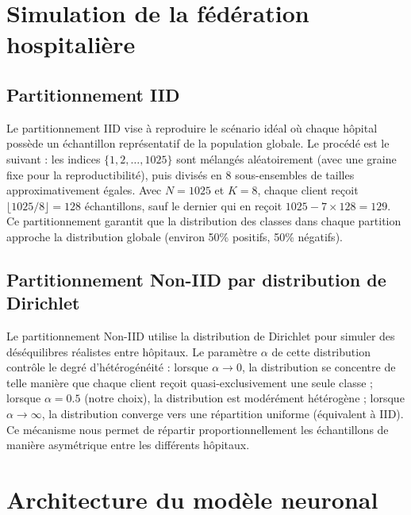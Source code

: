 \documentclass[12pt,a4paper]{report}
\begin{document}
\section{Simulation de la f\'{e}d\'{e}ration hospitali\`{e}re}

\subsection{Partitionnement IID}

Le partitionnement IID vise \`{a} reproduire le sc\'{e}nario id\'{e}al o\`{u} chaque h\^{o}pital poss\`{e}de un \'{e}chantillon repr\'{e}sentatif de la population globale. Le proc\'{e}d\'{e} est le suivant : les indices $\{1, 2, \ldots, 1025\}$ sont m\'{e}lang\'{e}s al\'{e}atoirement (avec une graine fixe pour la reproductibilit\'{e}), puis divis\'{e}s en 8 sous-ensembles de tailles approximativement \'{e}gales. Avec $N = 1025$ et $K = 8$, chaque client re\c{c}oit $\lfloor 1025/8 \rfloor = 128$ \'{e}chantillons, sauf le dernier qui en re\c{c}oit $1025 - 7 \times 128 = 129$. Ce partitionnement garantit que la distribution des classes dans chaque partition approche la distribution globale (environ 50\% positifs, 50\% n\'{e}gatifs).

\subsection{Partitionnement Non-IID par distribution de Dirichlet}

Le partitionnement Non-IID utilise la distribution de Dirichlet pour simuler des d\'{e}s\'{e}quilibres r\'{e}alistes entre h\^{o}pitaux. Le param\`{e}tre $\alpha$ de cette distribution contr\^{o}le le degr\'{e} d'h\'{e}t\'{e}rog\'{e}n\'{e}it\'{e} : lorsque $\alpha \to 0$, la distribution se concentre de telle mani\`{e}re que chaque client re\c{c}oit quasi-exclusivement une seule classe ; lorsque $\alpha = 0.5$ (notre choix), la distribution est mod\'{e}r\'{e}ment h\'{e}t\'{e}rog\`{e}ne ; lorsque $\alpha \to \infty$, la distribution converge vers une r\'{e}partition uniforme (\'{e}quivalent \`{a} IID). Ce m\'{e}canisme nous permet de r\'{e}partir proportionnellement les \'{e}chantillons de mani\`{e}re asym\'{e}trique entre les diff\'{e}rents h\^{o}pitaux.

\section{Architecture du mod\`{e}le neuronal}
\end{document}
